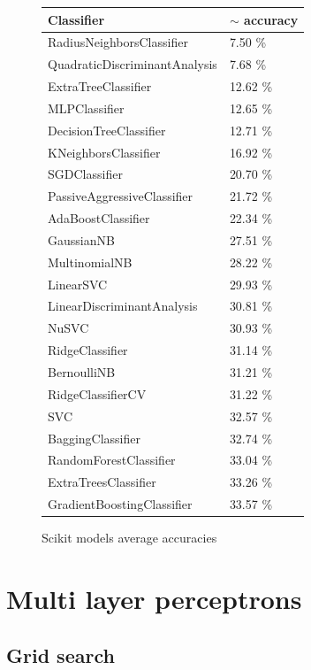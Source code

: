 \begin{figure}

\centering

\begin{tabular}{|l|l|}
\hline 
Classifier & $\sim$ accuracy \\
\hline 
RadiusNeighborsClassifier & 7.50 \% \\
QuadraticDiscriminantAnalysis & 7.68 \% \\
ExtraTreeClassifier & 12.62 \% \\
MLPClassifier & 12.65 \% \\
DecisionTreeClassifier & 12.71 \% \\
KNeighborsClassifier & 16.92 \% \\
SGDClassifier & 20.70 \% \\
PassiveAggressiveClassifier & 21.72 \% \\
AdaBoostClassifier & 22.34 \% \\
GaussianNB & 27.51 \% \\
MultinomialNB & 28.22 \% \\
LinearSVC & 29.93 \% \\
LinearDiscriminantAnalysis & 30.81 \% \\
NuSVC & 30.93 \% \\
RidgeClassifier & 31.14 \% \\
BernoulliNB & 31.21 \% \\
RidgeClassifierCV & 31.22 \% \\
SVC & 32.57 \% \\
BaggingClassifier & 32.74 \% \\
RandomForestClassifier & 33.04 \% \\
ExtraTreesClassifier & 33.26 \% \\
GradientBoostingClassifier & 33.57 \% \\ 
\hline
\end{tabular}

\caption{Scikit models average accuracies}
\label{figure-scikit}

\end{figure}

\section{Multi layer perceptrons}
\subsection*{Grid search}

